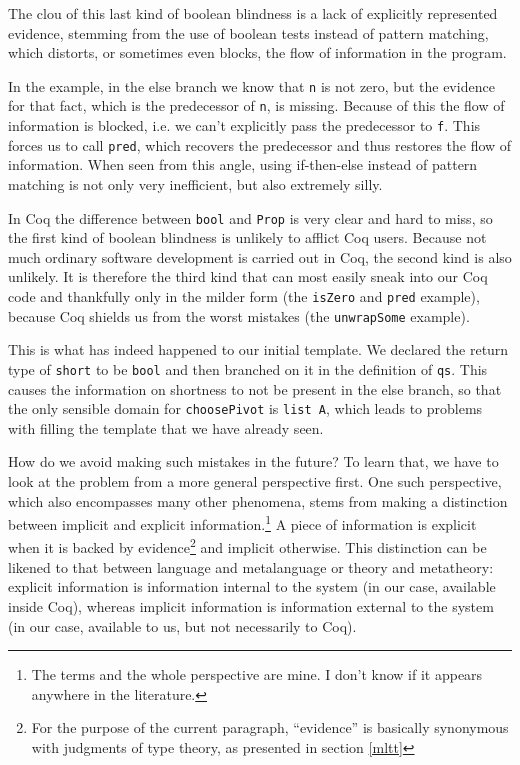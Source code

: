 \documentclass[declaration,mgr,english,shortabstract]{iithesis}
\newcommand{\m}[1]{\texttt{#1}}
\begin{document}
The clou of this last kind of boolean blindness is a lack of explicitly represented evidence, stemming from the use of boolean tests instead of pattern matching, which distorts, or sometimes even blocks, the flow of information in the program.

In the example, in the else branch we know that \m{n} is not zero, but the evidence for that fact, which is the predecessor of \m{n}, is missing. Because of this the flow of information is blocked, i.e. we can't explicitly pass the predecessor to \m{f}. This forces us to call \m{pred}, which recovers the predecessor and thus restores the flow of information. When seen from this angle, using if-then-else instead of pattern matching is not only very inefficient, but also extremely silly.

In Coq the difference between \m{bool} and \m{Prop} is very clear and hard to miss, so the first kind of boolean blindness is unlikely to afflict Coq users. Because not much ordinary software development is carried out in Coq, the second kind is also unlikely. It is therefore the third kind that can most easily sneak into our Coq code and thankfully only in the milder form (the \m{isZero} and \m{pred} example), because Coq shields us from the worst mistakes (the \m{unwrapSome} example).

This is what has indeed happened to our initial template. We declared the return type of \m{short} to be \m{bool} and then branched on it in the definition of \m{qs}. This causes the information on shortness to not be present in the else branch, so that the only sensible domain for \m{choosePivot} is \m{list A}, which leads to problems with filling the template that we have already seen.

How do we avoid making such mistakes in the future? To learn that, we have to look at the problem from a more general perspective first. One such perspective, which also encompasses many other phenomena, stems from making a distinction between implicit and explicit information.\footnote{The terms and the whole perspective are mine. I don't know if it appears anywhere in the literature.} A piece of information is explicit when it is backed by evidence\footnote{For the purpose of the current paragraph, ``evidence'' is basically synonymous with judgments of type theory, as presented in section \ref{mltt}} and implicit otherwise. This distinction can be likened to that between language and metalanguage or theory and metatheory: explicit information is information internal to the system (in our case, available inside Coq), whereas implicit information is information external to the system (in our case, available to us, but not necessarily to Coq).
\end{document}
